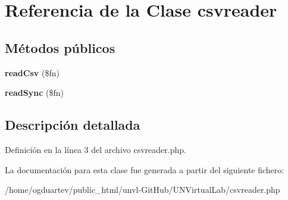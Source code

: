 \hypertarget{classcsvreader}{}\section{Referencia de la Clase csvreader}
\label{classcsvreader}
\subsection*{Métodos públicos}
\begin{DoxyCompactItemize}
\item 
\mbox{\label{classcsvreader_aa452a501204476ec83163c625a75e709}} 
{\bfseries read\+Csv} (\$fn)
\item 
\mbox{\label{classcsvreader_a0dcd4aba99b7cfc585420b96bc3e8618}} 
{\bfseries read\+Sync} (\$fn)
\end{DoxyCompactItemize}


\subsection{Descripción detallada}


Definición en la línea 3 del archivo csvreader.\+php.



La documentación para esta clase fue generada a partir del siguiente fichero\+:\begin{DoxyCompactItemize}
\item 
/home/ogduartev/public\+\_\+html/unvl-\/\+Git\+Hub/\+U\+N\+Virtual\+Lab/csvreader.\+php\end{DoxyCompactItemize}
